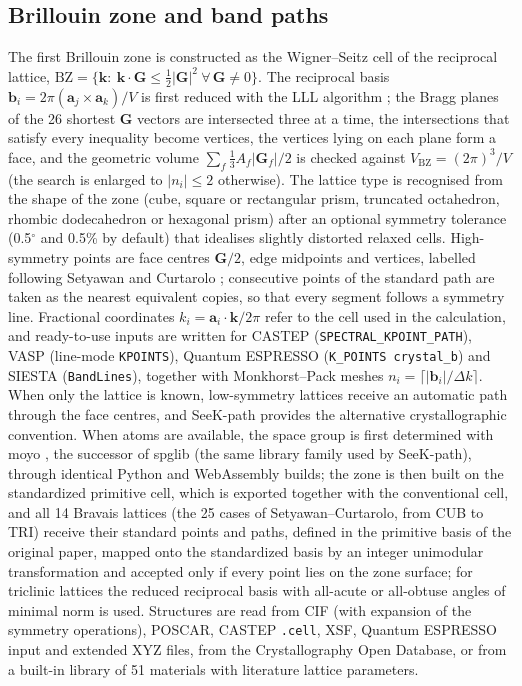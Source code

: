 \documentclass[11pt,a4paper]{article}
\newcommand{\code}[1]{\texttt{#1}}
\begin{document}
\subsection{Brillouin zone and band paths}\label{sec:bz}
The first Brillouin zone is constructed as the Wigner--Seitz cell of the reciprocal lattice, $\mathrm{BZ}=\{\bm k:\ \bm k\cdot\mathbf G\le\tfrac12|\mathbf G|^2\ \forall\,\mathbf G\neq0\}$. The reciprocal basis $\mathbf b_i=2\pi(\mathbf a_j\times\mathbf a_k)/V$ is first reduced with the LLL algorithm \cite{lenstra1982}; the Bragg planes of the 26 shortest $\mathbf G$ vectors are intersected three at a time, the intersections that satisfy every inequality become vertices, the vertices lying on each plane form a face, and the geometric volume $\sum_f\tfrac13A_f|\mathbf G_f|/2$ is checked against $V_\mathrm{BZ}=(2\pi)^3/V$ (the search is enlarged to $|n_i|\le2$ otherwise). The lattice type is recognised from the shape of the zone (cube, square or rectangular prism, truncated octahedron, rhombic dodecahedron or hexagonal prism) after an optional symmetry tolerance (0.5$^\circ$ and 0.5\% by default) that idealises slightly distorted relaxed cells. High-symmetry points are face centres $\mathbf G/2$, edge midpoints and vertices, labelled following Setyawan and Curtarolo \cite{setyawan2010}; consecutive points of the standard path are taken as the nearest equivalent copies, so that every segment follows a symmetry line. Fractional coordinates $k_i=\mathbf a_i\cdot\bm k/2\pi$ refer to the cell used in the calculation, and ready-to-use inputs are written for CASTEP (\code{SPECTRAL\_KPOINT\_PATH}), VASP (line-mode \code{KPOINTS}), Quantum ESPRESSO (\code{K\_POINTS crystal\_b}) and SIESTA (\code{BandLines}), together with Monkhorst--Pack meshes $n_i=\lceil|\mathbf b_i|/\Delta k\rceil$. When only the lattice is known, low-symmetry lattices receive an automatic path through the face centres, and SeeK-path \cite{hinuma2017} provides the alternative crystallographic convention. When atoms are available, the space group is first determined with moyo \cite{moyo}, the successor of spglib \cite{togo2024spglib} (the same library family used by SeeK-path), through identical Python and WebAssembly builds; the zone is then built on the standardized primitive cell, which is exported together with the conventional cell, and all 14 Bravais lattices (the 25 cases of Setyawan--Curtarolo, from CUB to TRI) receive their standard points and paths, defined in the primitive basis of the original paper, mapped onto the standardized basis by an integer unimodular transformation and accepted only if every point lies on the zone surface; for triclinic lattices the reduced reciprocal basis with all-acute or all-obtuse angles of minimal norm is used. Structures are read from CIF (with expansion of the symmetry operations), POSCAR, CASTEP \code{.cell}, XSF, Quantum ESPRESSO input and extended XYZ files, from the Crystallography Open Database, or from a built-in library of 51 materials with literature lattice parameters.
\end{document}
